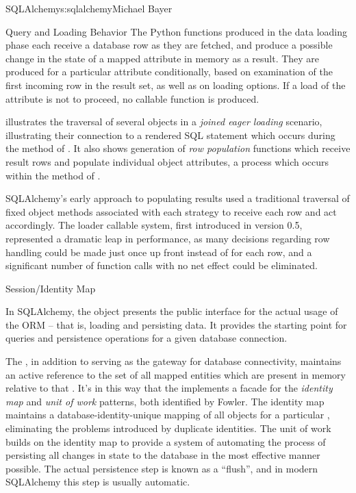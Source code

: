 \begin{aosachapter}{SQLAlchemy}{s:sqlalchemy}{Michael Bayer}
\begin{aosasect1}{Query and Loading Behavior}
The Python functions produced in the data loading phase each receive a database row
as they are fetched, and produce a possible change in the state of
a mapped attribute in memory as a result.   They are produced for a particular attribute
conditionally, based on examination of the first incoming row in the result set, as well as
on loading options.   If a load of the attribute is not to proceed, no callable function is produced.

 illustrates the traversal of several  objects in a \emph{joined eager loading}
scenario, illustrating their connection to a rendered SQL statement which occurs during the 
method of .  It also shows generation of \emph{row population} functions which receive result rows
and populate individual object attributes, a process which occurs within the  method of .


SQLAlchemy's early approach to populating results used a traditional traversal
of fixed object methods associated with each strategy to receive each row and
act accordingly. The loader callable system, first introduced in version 0.5,
represented a dramatic leap in performance, as many decisions regarding row
handling could be made just once up front instead of for each row, and a
significant number of function calls with no net effect could be eliminated.

\end{aosasect1}

\begin{aosasect1}{Session/Identity Map}

In SQLAlchemy,
the  object presents the public interface for the actual usage of
the ORM – that is, loading and persisting data.  It provides the starting
point for queries and persistence operations for a given database connection.

The , in addition to serving as the gateway for database connectivity,
maintains an active reference to the set of all mapped entities which are present
in memory relative to that .  It's in this way that the 
implements a facade for the \emph{identity map} and \emph{unit of work} patterns, both
identified by Fowler.   The identity map maintains a database-identity-unique
mapping of all objects for a particular , eliminating the problems
introduced by duplicate identities.  The unit of work builds on the identity map
to provide a system of automating the process of persisting all changes in state to the
database in the most effective manner possible.   The actual persistence step
is known as a ``flush'', and in modern SQLAlchemy this step is usually automatic.


\end{aosasect1}
\end{aosachapter}
